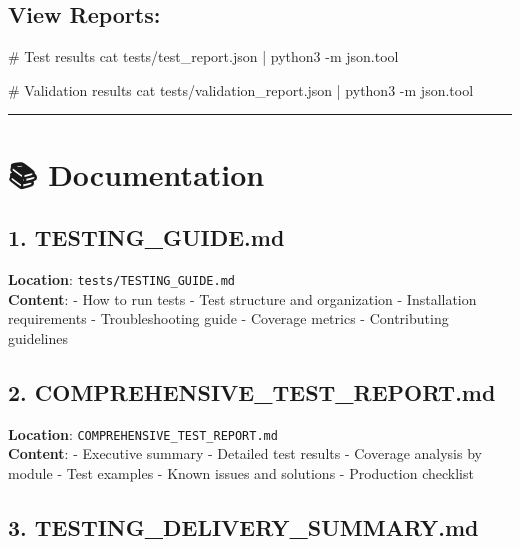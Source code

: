 \documentclass[
  11pt,
  oneside,
  openany]{scrbook}
\newenvironment{Shaded}{\begin{snugshade}}{\end{snugshade}}
\newcommand{\AttributeTok}[1]{\textcolor[rgb]{0.40,0.45,0.13}{#1}}
\newcommand{\CommentTok}[1]{\textcolor[rgb]{0.37,0.37,0.37}{#1}}
\newcommand{\ExtensionTok}[1]{\textcolor[rgb]{0.00,0.23,0.31}{#1}}
\newcommand{\FunctionTok}[1]{\textcolor[rgb]{0.28,0.35,0.67}{#1}}
\newcommand{\KeywordTok}[1]{\textcolor[rgb]{0.00,0.23,0.31}{#1}}
\newcommand{\NormalTok}[1]{\textcolor[rgb]{0.00,0.23,0.31}{#1}}
\begin{document}
\subsection{View Reports:}\label{view-reports}

\begin{Shaded}
\begin{Highlighting}[]
\CommentTok{\# Test results}
\FunctionTok{cat}\NormalTok{ tests/test\_report.json }\KeywordTok{|} \ExtensionTok{python3} \AttributeTok{{-}m}\NormalTok{ json.tool}

\CommentTok{\# Validation results}
\FunctionTok{cat}\NormalTok{ tests/validation\_report.json }\KeywordTok{|} \ExtensionTok{python3} \AttributeTok{{-}m}\NormalTok{ json.tool}
\end{Highlighting}
\end{Shaded}

\begin{center}\rule{0.5\linewidth}{0.5pt}\end{center}

\section{📚 Documentation}\label{documentation}

\subsection{1. TESTING\_GUIDE.md}\label{testing_guide.md}

\textbf{Location}: \texttt{tests/TESTING\_GUIDE.md}\\
\textbf{Content}: - How to run tests - Test structure and organization -
Installation requirements - Troubleshooting guide - Coverage metrics -
Contributing guidelines

\subsection{2.
COMPREHENSIVE\_TEST\_REPORT.md}\label{comprehensive_test_report.md}

\textbf{Location}: \texttt{COMPREHENSIVE\_TEST\_REPORT.md}\\
\textbf{Content}: - Executive summary - Detailed test results - Coverage
analysis by module - Test examples - Known issues and solutions -
Production checklist

\subsection{3.
TESTING\_DELIVERY\_SUMMARY.md}\label{testing_delivery_summary.md}
\end{document}
